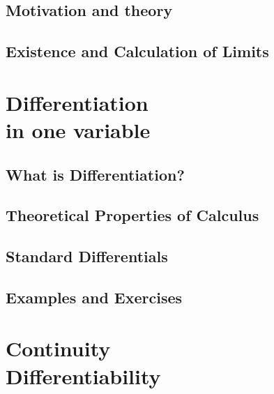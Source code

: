 \chapter{Motivation and theory}



\chapter{Existence and Calculation of Limits}






\part{Differentiation \\ \quad in one variable }

\chapter{What is Differentiation?}



\chapter{Theoretical Properties of Calculus}



\chapter{Standard Differentials}



\chapter{Examples and Exercises}



\part{Continuity \\ Differentiability}

